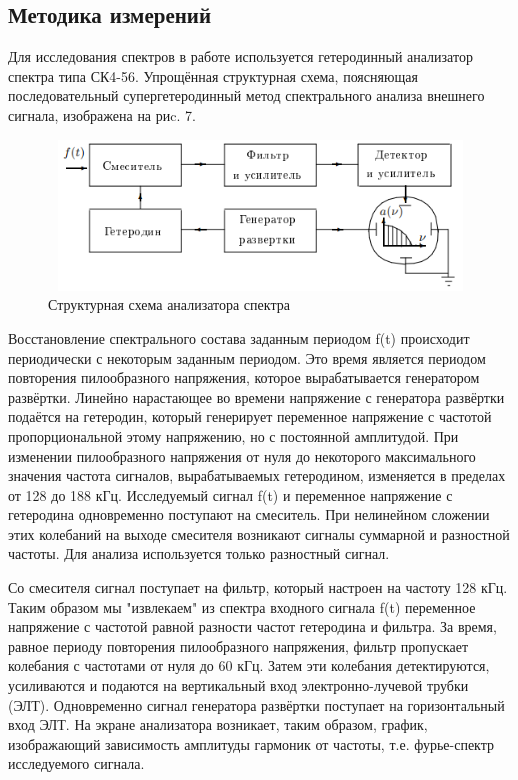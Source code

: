 \documentclass[12pt,a4paper]{article}
\begin{document}
	\subsection{Методика измерений}
	
	Для исследования спектров в работе используется гетеродинный анализатор спектра типа СК4-56. Упрощённая структурная схема, поясняющая последовательный супергетеродинный метод спектрального анализа внешнего сигнала, изображена на риc. 7.
	
\begin{figure}[H]
	\begin{center}
		\includegraphics[width=15cm, height=4cm]{3.6.1-7}
		\caption{Структурная схема анализатора спектра}
	\end{center}
\end{figure}
	
	Восстановление спектрального состава заданным периодом f(t) происходит периодически с некоторым заданным периодом. Это время является периодом повторения пилообразного напряжения, которое вырабатывается генератором развёртки. Линейно нарастающее во времени напряжение с генератора развёртки подаётся на гетеродин, который генерирует переменное напряжение с частотой пропорциональной этому напряжению, но с постоянной амплитудой. При изменении пилообразного напряжения от нуля до некоторого максимального значения частота сигналов, вырабатываемых гетеродином, изменяется в пределах от 128 до 188 кГц. Исследуемый сигнал f(t) и переменное напряжение с гетеродина одновременно поступают на смеситель. При нелинейном сложении этих колебаний на выходе смесителя возникают сигналы суммарной и разностной частоты. Для анализа используется только разностный сигнал.
	
	Со смесителя сигнал поступает на фильтр, который настроен на частоту 128 кГц. Таким образом мы "извлекаем" из спектра входного сигнала f(t) переменное напряжение с частотой равной разности частот гетеродина и фильтра. За время, равное периоду повторения пилообразного напряжения, фильтр пропускает колебания с частотами от нуля до 60 кГц. Затем эти колебания детектируются, усиливаются и подаются на вертикальный вход электронно-лучевой трубки (ЭЛТ). Одновременно сигнал генератора развёртки поступает на горизонтальный вход ЭЛТ. На экране анализатора возникает, таким образом, график, изображающий зависимость амплитуды гармоник от частоты, т.е. фурье-спектр исследуемого сигнала. 
\end{document}
